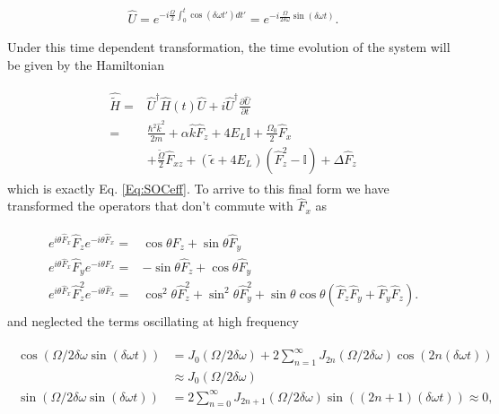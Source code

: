 \begin{align}
	\hat{U} = e^{-i\frac{\Omega}{2}\int_0^t\cos(\delta\omega t')dt'} = e^{-i\frac{\Omega}{2\delta\omega}\sin(\delta\omega t)}.
\end{align}

Under this time dependent transformation, the time evolution of the system will be given by the Hamiltonian
%

\begin{align}
	\begin{split}
		\hat{\tilde{H}} = & \hat{U}^{\dagger}\hat{H}(t)\hat{U} + i\hat{U}^{\dagger} \frac{\partial\hat{U}}{\partial t} \\
		 = &\frac{\hbar^2\hat{k}^2}{2m} + \alpha\hat{k}\hat{F}_z +4E_L\mathbb{I} + \frac{\Omega_0}{2}\hat{F}_x \\
		&+ \frac{\tilde{\Omega}}{2}\hat{F}_{xz} +(\tilde{\epsilon}+4E_L)(\hat{F}_z^2-\mathbb{I}) +\Delta\hat{F}_z 	
	\end{split}
\end{align}
%
%
which is exactly Eq. \ref{Eq:SOCeff}. To arrive to this final form we have transformed the operators that don't commute with $\hat{F}_x$ as

%
\begin{align}
	\begin{split}
		e^{i\theta \hat{F}_x} \hat{F}_z e^{-i\theta \hat{F}_x}=& \cos\theta \hat{F}_z + \sin\theta\hat{F}_y \\
		e^{i\theta \hat{F}_x} \hat{F}_y e^{-i\theta \hat{F}_x} =& -\sin\theta\hat{F}_z +\cos\theta\hat{F}_y \\
		e^{i\theta \hat{F}_x} \hat{F}_z^2 e^{-i\theta \hat{F}_x} = &\cos^2\theta\hat{F}_z^2+\sin^2\theta\hat{F}_y^2 + \sin\theta\cos\theta(\hat{F}_z\hat{F}_y + \hat{F}_y\hat{F}_z).
	\end{split}
\end{align}
%
and neglected the terms oscillating at high frequency

\begin{align}
	\begin{split}
	\cos(\Omega/2\delta\omega\sin(\delta\omega t))&= J_0(\Omega/2\delta\omega) + 2\sum_{n=1}^{\infty}J_{2n}(\Omega/2\delta\omega)\cos(2n(\delta\omega t)) \\
	& \approx J_0(\Omega/2\delta\omega) \\
	\sin(\Omega/2\delta\omega\sin(\delta\omega t))&= 2\sum_{n=0}^{\infty}J_{2n+1}(\Omega/2\delta\omega)\sin((2n+1)(\delta\omega t)) \approx 0,
	\end{split}
\end{align} 


